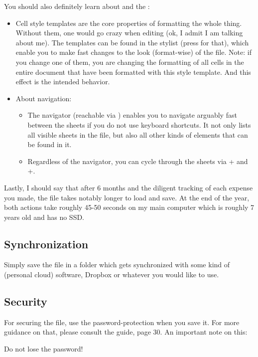 You should also definitely learn about  and the :
\begin{itemize}
	\item Cell style templates are the core properties of formatting the whole thing.
	Without them, one would go crazy when editing \tfn (ok, I admit I am talking about me).
	The templates can be found in the stylist (press  for that), which enable you to make fast changes to the look (format-wise) of the file.
	Note: if you change one of them, you are changing the formatting of all cells in the entire document that have been formatted with this style template.
	And this effect is the intended behavior.
	\item About navigation:
	\begin{itemize}
		\item The navigator (reachable via ) enables you to navigate arguably fast between the sheets if you do not use keyboard shortcuts.
		It not only lists all visible sheets in the file, but also all other kinds of elements that can be found in it.
		\item Regardless of the navigator, you can cycle through the sheets via + and +.
	\end{itemize}
\end{itemize}

Lastly, I should say that after 6 months and the diligent tracking of each expense you made, the file takes notably longer to load and save.
At the end of the year, both actions take roughly 45-50 seconds on my main computer which is roughly 7 years old and has no SSD.

\subsection{Synchronization}
\label{subsec:synchronization}

Simply save the file in a folder which gets synchronized with some kind of (personal cloud) software, \eg Dropbox or whatever you would like to use.

\subsection{Security}
\label{subsec:security}

For securing the file, use the password-protection when you save it.
For more guidance on that, please consult the  guide, page 30.
An important note on this:
\begin{specialnote}
Do not lose the password!
\end{specialnote}

